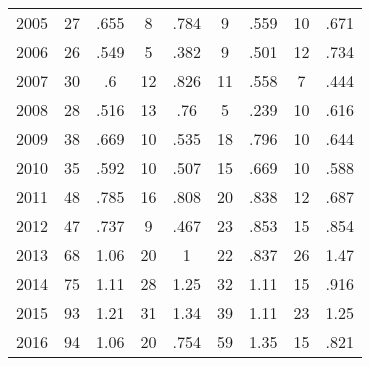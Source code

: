 \begin{table}[htbp]
\begin{tabular}{l*{8}{c}}
2005      &       27&     .655&        8&     .784&        9&     .559&       10&     .671\\
2006      &       26&     .549&        5&     .382&        9&     .501&       12&     .734\\
2007      &       30&       .6&       12&     .826&       11&     .558&        7&     .444\\
2008      &       28&     .516&       13&      .76&        5&     .239&       10&     .616\\
2009      &       38&     .669&       10&     .535&       18&     .796&       10&     .644\\
2010      &       35&     .592&       10&     .507&       15&     .669&       10&     .588\\
2011      &       48&     .785&       16&     .808&       20&     .838&       12&     .687\\
2012      &       47&     .737&        9&     .467&       23&     .853&       15&     .854\\
2013      &       68&     1.06&       20&        1&       22&     .837&       26&     1.47\\
2014      &       75&     1.11&       28&     1.25&       32&     1.11&       15&     .916\\
2015      &       93&     1.21&       31&     1.34&       39&     1.11&       23&     1.25\\
2016      &       94&     1.06&       20&     .754&       59&     1.35&       15&     .821\\
\hline\hline
\end{tabular}
\end{table}
